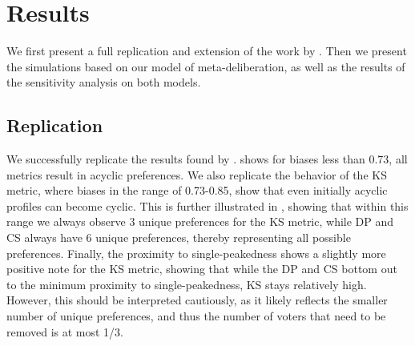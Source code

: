 \newpage
\chapter{Results}
\label{experiment_results}
We first present a full replication and extension of the work by
\citet{radDeliberationSinglePeakednessCoherent2021}. Then we present the simulations based on our model of
meta-deliberation, as well as the results of the sensitivity analysis on both
models.


\section{Replication}\label{sec: replication}

We successfully replicate the results found by
\citet{radDeliberationSinglePeakednessCoherent2021}. 
shows for biases less than 0.73, all metrics result in acyclic preferences. We also
replicate the behavior of the KS metric, where biases in the range of
0.73-0.85, show that even initially acyclic profiles can become cyclic. This is
further illustrated in , showing that within this range we
always observe 3 unique preferences for the KS metric, while DP and CS always
have 6 unique preferences, thereby representing all possible preferences.
Finally, the proximity to single-peakedness shows a slightly more positive note
for the KS metric, showing that while the DP and CS bottom out to the minimum
proximity to single-peakedness, KS stays relatively high. However, this should
be interpreted cautiously, as it likely reflects the smaller number of unique
preferences, and thus the number of voters that need to be removed is at most
1/3.

